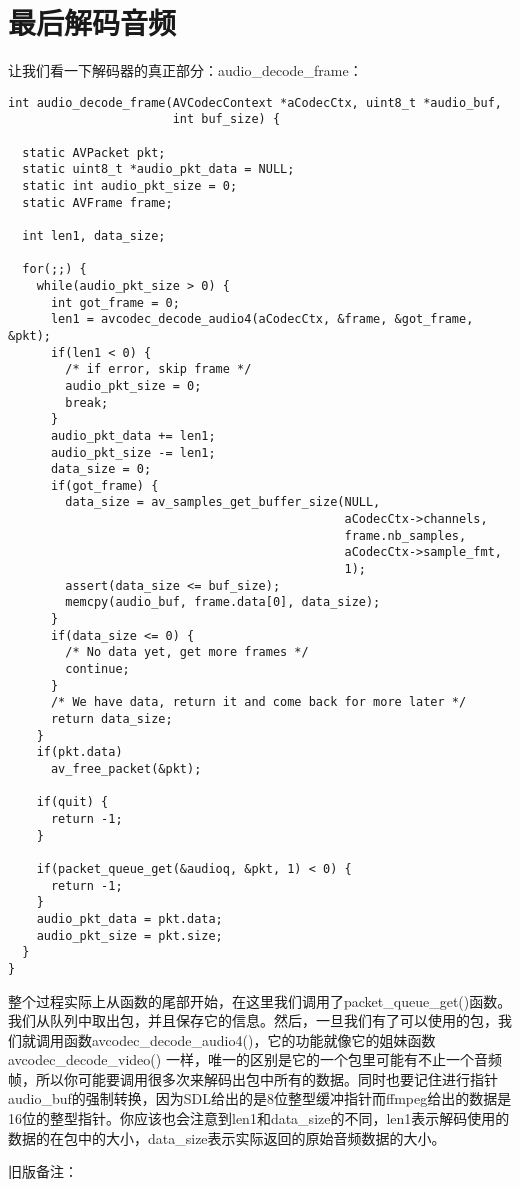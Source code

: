 \section{最后解码音频}
让我们看一下解码器的真正部分：audio_decode_frame：
\begin{lstlisting}
int audio_decode_frame(AVCodecContext *aCodecCtx, uint8_t *audio_buf,
                       int buf_size) {

  static AVPacket pkt;
  static uint8_t *audio_pkt_data = NULL;
  static int audio_pkt_size = 0;
  static AVFrame frame;

  int len1, data_size;

  for(;;) {
    while(audio_pkt_size > 0) {
      int got_frame = 0;
      len1 = avcodec_decode_audio4(aCodecCtx, &frame, &got_frame, &pkt);
      if(len1 < 0) {
        /* if error, skip frame */
        audio_pkt_size = 0;
        break;
      }
      audio_pkt_data += len1;
      audio_pkt_size -= len1;
	  data_size = 0;
	  if(got_frame) {
	    data_size = av_samples_get_buffer_size(NULL,
		                                       aCodecCtx->channels,
											   frame.nb_samples,
											   aCodecCtx->sample_fmt,
											   1);
		assert(data_size <= buf_size);
		memcpy(audio_buf, frame.data[0], data_size);
	  }
      if(data_size <= 0) {
        /* No data yet, get more frames */
        continue;
      }
      /* We have data, return it and come back for more later */
      return data_size;
    }
    if(pkt.data)
      av_free_packet(&pkt);

    if(quit) {
      return -1;
    }

    if(packet_queue_get(&audioq, &pkt, 1) < 0) {
      return -1;
    }
    audio_pkt_data = pkt.data;
    audio_pkt_size = pkt.size;
  }
}
\end{lstlisting}

整个过程实际上从函数的尾部开始，在这里我们调用了packet_queue_get()函数。我们从队列中取出包，并且保存它的信息。然后，一旦我们有了可以使用的包，我们就调用函数avcodec_decode_audio4()，它的功能就像它的姐妹函数avcodec_decode_video() 一样，唯一的区别是它的一个包里可能有不止一个音频帧，所以你可能要调用很多次来解码出包中所有的数据。同时也要记住进行指针audio_buf的强制转换，因为SDL给出的是8位整型缓冲指针而ffmpeg给出的数据是16位的整型指针。你应该也会注意到len1和data_size的不同，len1表示解码使用的数据的在包中的大小，data_size表示实际返回的原始音频数据的大小。

旧版备注：

